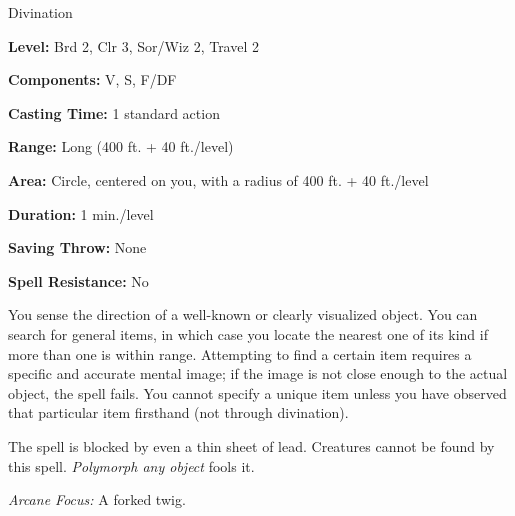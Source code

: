 
Divination

\textbf{Level:} Brd 2, Clr 3, Sor/Wiz 2, Travel 2

\textbf{Components:} V, S, F/DF

\textbf{Casting Time:} 1 standard action

\textbf{Range:} Long (400 ft. + 40 ft./level)

\textbf{Area:} Circle, centered on you, with a radius of 400 ft. + 40 ft./level

\textbf{Duration:} 1 min./level

\textbf{Saving Throw:} None

\textbf{Spell Resistance:} No

You sense the direction of a well-known or clearly visualized object. You can search 
for general items, in which case you locate the nearest one of its kind if more 
than one is within range. Attempting to find a certain item requires a specific 
and accurate mental image; if the image is not close enough to the actual object, 
the spell fails. You cannot specify a unique item unless you have observed that 
particular item firsthand (not through divination).

The spell is blocked by even a thin sheet of lead. Creatures cannot be found by 
this spell. \textit{Polymorph any object} fools it.

\textit{Arcane Focus:} A forked twig.

